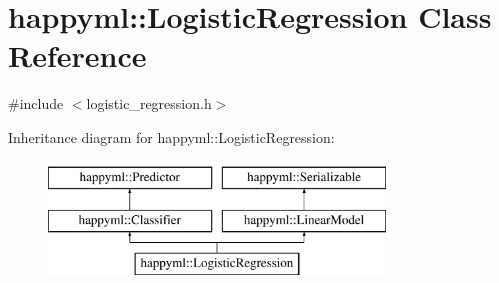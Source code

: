 \hypertarget{classhappyml_1_1LogisticRegression}{}\section{happyml\+:\+:Logistic\+Regression Class Reference}
\label{classhappyml_1_1LogisticRegression}


{\ttfamily \#include $<$logistic\+\_\+regression.\+h$>$}

Inheritance diagram for happyml\+:\+:Logistic\+Regression\+:\begin{figure}[H]
\begin{center}
\leavevmode
\includegraphics[height=3.000000cm]{classhappyml_1_1LogisticRegression}
\end{center}
\end{figure}
